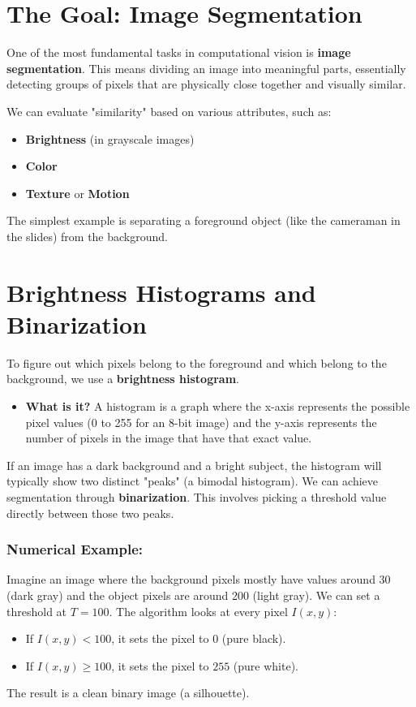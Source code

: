 \documentclass{report}
\begin{document}
\section{The Goal: Image Segmentation}
One of the most fundamental tasks in computational vision is \textbf{image segmentation}. This means dividing an image into meaningful parts, essentially detecting groups of pixels that are physically close together and visually similar.

We can evaluate "similarity" based on various attributes, such as:
\begin{itemize}
    \item \textbf{Brightness} (in grayscale images)
    \item \textbf{Color}
    \item \textbf{Texture} or \textbf{Motion}
\end{itemize}

The simplest example is separating a foreground object (like the cameraman in the slides) from the background.

\section{Brightness Histograms and Binarization}
To figure out which pixels belong to the foreground and which belong to the background, we use a \textbf{brightness histogram}.
\begin{itemize}
    \item \textbf{What is it?} A histogram is a graph where the x-axis represents the possible pixel values (0 to 255 for an 8-bit image) and the y-axis represents the number of pixels in the image that have that exact value.
\end{itemize}

If an image has a dark background and a bright subject, the histogram will typically show two distinct "peaks" (a bimodal histogram). We can achieve segmentation through \textbf{binarization}. This involves picking a threshold value directly between those two peaks.

\subsubsection{Numerical Example:}
Imagine an image where the background pixels mostly have values around 30 (dark gray) and the object pixels are around 200 (light gray).
We can set a threshold at $T = 100$.
The algorithm looks at every pixel $I(x,y)$:
\begin{itemize}
    \item If $I(x,y) < 100$, it sets the pixel to $0$ (pure black).
    \item If $I(x,y) \ge 100$, it sets the pixel to $255$ (pure white).
\end{itemize}
The result is a clean binary image (a silhouette).
\end{document}
